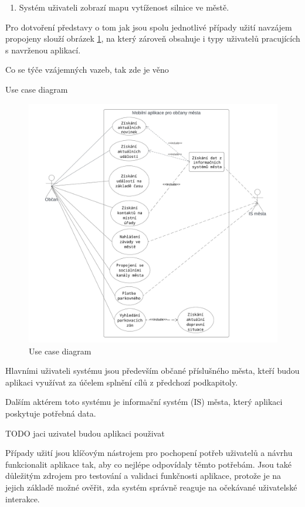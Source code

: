 \begin{enumerate}
  \item Systém uživateli zobrazí mapu vytíženost silnice ve městě.
\end{enumerate}

Pro dotvoření představy o tom jak jsou spolu jednotlivé případy užití navzájem propojeny slouží obrázek \ref{fig:use_case_diagram}, na který zároveň 
obsahuje i typy uživatelů pracujících s navrženou aplikací.

Co se týče vzájemných vazeb, tak zde je věno

Use case diagram
\begin{figure}[H]
  \centering
  \includegraphics[width=.99\textwidth]{Use case diagram.png}
  \caption{Use case diagram}
  \label{fig:use_case_diagram}
\end{figure}

Hlavními uživateli systému jsou především občané příslušného města, kteří budou aplikaci využívat za účelem splnění cílů z předchozí podkapitoly.

Dalším aktérem toto systému je informační systém (IS) města, který aplikaci poskytuje potřebná data.

TODO jaci uzivatel budou aplikaci použivat

\bigskip

Případy užití jsou klíčovým nástrojem pro pochopení potřeb uživatelů a návrhu funkcionalit aplikace tak, aby co nejlépe odpovídaly těmto potřebám. 
Jsou také důležitým zdrojem pro testování a validaci funkčnosti aplikace, protože je na jejich základě možné ověřit, zda systém správně reaguje na očekávané 
uživatelské interakce. 

